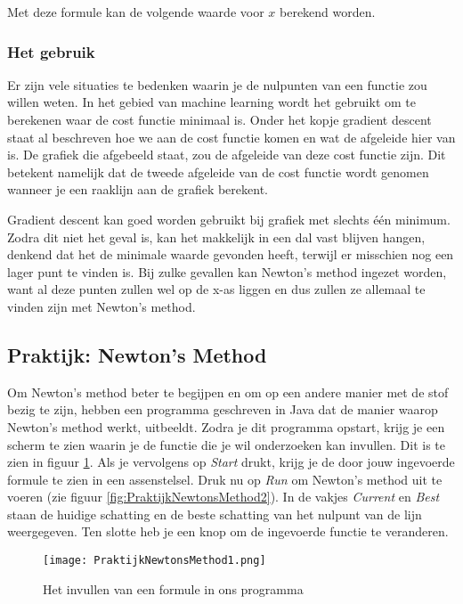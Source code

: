Met deze formule kan de volgende waarde voor $x$ berekend worden.

\subsubsection{Het gebruik}
Er zijn vele situaties te bedenken waarin je de nulpunten van een functie zou willen weten. In het gebied van machine learning wordt het gebruikt om te berekenen waar de cost functie minimaal is. Onder het kopje gradient descent staat al beschreven hoe we aan de cost functie komen en wat de afgeleide hier van is. De grafiek die afgebeeld staat, zou de afgeleide van deze cost functie zijn. Dit betekent namelijk dat de tweede afgeleide van de cost functie wordt genomen wanneer je een raaklijn aan de grafiek berekent.

Gradient descent kan goed worden gebruikt bij grafiek met slechts \'e\'en minimum. Zodra dit niet het geval is, kan het makkelijk in een dal vast blijven hangen, denkend dat het de minimale waarde gevonden heeft, terwijl er misschien nog een lager punt te vinden is. Bij zulke gevallen kan Newton's method ingezet worden, want al deze punten zullen wel op de x-as liggen en dus zullen ze allemaal te vinden zijn met Newton's method.

\subsection{Praktijk: Newton's Method}
Om Newton's method beter te begijpen en om op een andere manier met de stof bezig te zijn, hebben een programma geschreven in Java dat de manier waarop Newton's method werkt, uitbeeldt. Zodra je dit programma opstart, krijg je een scherm te zien waarin je de functie die je wil onderzoeken kan invullen. Dit is te zien in figuur \ref{fig:PraktijkNewtonsMethod1}. Als je vervolgens op \textit{Start} drukt, krijg je de door jouw ingevoerde formule te zien in een assenstelsel. Druk nu op \textit{Run} om Newton's method uit te voeren (zie figuur \ref{fig:PraktijkNewtonsMethod2}). In de vakjes \textit{Current} en \textit{Best} staan de huidige schatting en de beste schatting van het nulpunt van de lijn weergegeven. Ten slotte heb je een knop om de ingevoerde functie te veranderen.

\begin{figure}[H]
  \centering
    \texttt{[image: PraktijkNewtonsMethod1.png]}
  \caption{Het invullen van een formule in ons programma}
  \label{fig:PraktijkNewtonsMethod1}
\end{figure}

